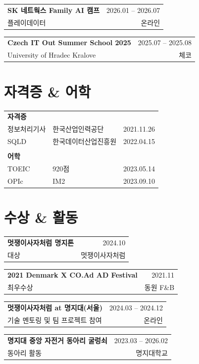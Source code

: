 \documentclass[a4paper, 11pt]{article}
\newcommand{\resumeSubheading}[4]{%
  \vspace{2pt}
  \begin{tabularx}{\textwidth}{l r}
    \textbf{#1} & \small #2 \\
    #3 & \small #4 \\
  \end{tabularx}
  \vspace{2pt}
}
\begin{document}
\resumeSubheading
  {SK 네트웍스 Family AI 캠프}
  {2026.01 -- 2026.07}
  {플레이데이터}
  {온라인}

\resumeSubheading
  {Czech IT Out Summer School 2025}
  {2025.07 -- 2025.08}
  {University of Hradec Kralove}
  {체코}


\section{자격증 \& 어학}

\begin{tabularx}{\textwidth}{l l l}
  \textbf{자격증} & & \\
  정보처리기사 & 한국산업인력공단 & 2021.11.26 \\
  SQLD & 한국데이터산업진흥원 & 2022.04.15 \\
  & & \\
  \textbf{어학} & & \\
  TOEIC & 920점 & 2023.05.14 \\
  OPIc & IM2 & 2023.09.10 \\
\end{tabularx}


\section{수상 \& 활동}

\resumeSubheading
  {멋쟁이사자처럼 명지톤}
  {2024.10}
  {대상}
  {멋쟁이사자처럼}

\resumeSubheading
  {2021 Denmark X CO.Ad AD Festival}
  {2021.11}
  {최우수상}
  {동원 F\&B}

\resumeSubheading
  {멋쟁이사자처럼 at 명지대(서울)}
  {2024.03 -- 2024.12}
  {기술 멘토링 및 팀 프로젝트 참여}
  {온라인}

\resumeSubheading
  {명지대 중앙 자전거 동아리 굴렁쇠}
  {2023.03 -- 2026.02}
  {동아리 활동}
  {명지대학교}
\end{document}
